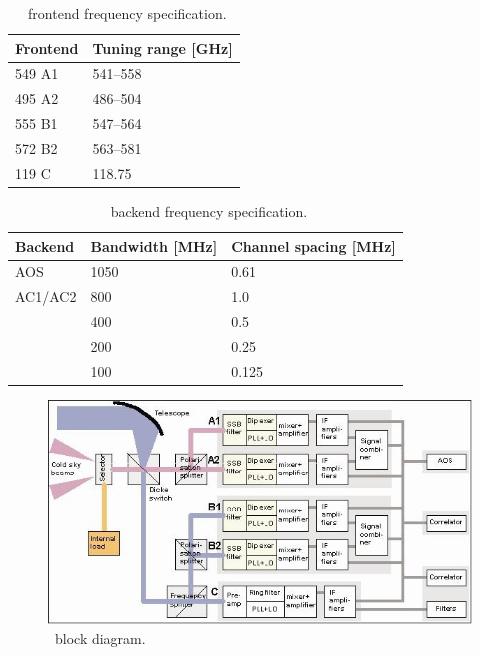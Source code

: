 \begin{table}
\caption{ \smr\ frontend frequency specification.}
\label{table:config1}
\begin{tabular}{|l|l|}
  \hline
  \textbf{Frontend} & \textbf{Tuning range {[}GHz{]} } \\
  \hline
  549 A1            & 541--558              \\
  \hline
  495 A2            & 486--504              \\
  \hline
  555 B1            & 547--564             \\
 \hline
 572 B2             & 563--581              \\
 \hline
  119 C             &  118.75               \\
\hline
\end{tabular}
\end{table}



\begin{table}
\caption{ \smr\ backend frequency specification.}
\label{table:config2}
\begin{tabular}{|l|l|l|}
  \hline
  \textbf{Backend} & \textbf{Bandwidth {[}MHz{]}} & \textbf{Channel spacing {[}MHz{]}} \\
  \hline
  AOS              & 1050                & 0.61\\
  \hline
  AC1/AC2          & 800                 & 1.0
 \\
 \cline{2-2}
 \cline{3-3}
                   & 400                  & 0.5 \\
 \cline{2-2}
 \cline{3-3}
                   & 200                  & 0.25 \\
 \cline{2-2}
 \cline{3-3}
                   & 100                 & 0.125 \\
\hline
\end{tabular}
\end{table}


\begin{figure}[t]
\includegraphics[width=14cm]{Odin_Auto2.jpg}
\caption{\smr\ block diagram.}
\label{fig:blockdiagram}
\end{figure}




